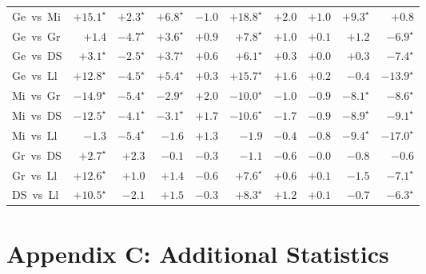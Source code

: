 \documentclass[11pt]{article}
\begin{document}
\begin{table}[H]
{\begin{tabular}{lrrrrrrrrr}
Ge~vs~Mi & $+15.1^\star$ & $+2.3^\star$ & $+6.8^\star$ & $-1.0$ & $+18.8^\star$ & $+2.0$ & $+1.0$ & $+9.3^\star$ & $+0.8$ \\
Ge~vs~Gr & $+1.4$ & $-4.7^\star$ & $+3.6^\star$ & $+0.9$ & $+7.8^\star$ & $+1.0$ & $+0.1$ & $+1.2$ & $-6.9^\star$ \\
Ge~vs~DS & $+3.1^\star$ & $-2.5^\star$ & $+3.7^\star$ & $+0.6$ & $+6.1^\star$ & $+0.3$ & $+0.0$ & $+0.3$ & $-7.4^\star$ \\
Ge~vs~Ll & $+12.8^\star$ & $-4.5^\star$ & $+5.4^\star$ & $+0.3$ & $+15.7^\star$ & $+1.6$ & $+0.2$ & $-0.4$ & $-13.9^\star$ \\
Mi~vs~Gr & $-14.9^\star$ & $-5.4^\star$ & $-2.9^\star$ & $+2.0$ & $-10.0^\star$ & $-1.0$ & $-0.9$ & $-8.1^\star$ & $-8.6^\star$ \\
Mi~vs~DS & $-12.5^\star$ & $-4.1^\star$ & $-3.1^\star$ & $+1.7$ & $-10.6^\star$ & $-1.7$ & $-0.9$ & $-8.9^\star$ & $-9.1^\star$ \\
Mi~vs~Ll & $-1.3$ & $-5.4^\star$ & $-1.6$ & $+1.3$ & $-1.9$ & $-0.4$ & $-0.8$ & $-9.4^\star$ & $-17.0^\star$ \\
Gr~vs~DS & $+2.7^\star$ & $+2.3$ & $-0.1$ & $-0.3$ & $-1.1$ & $-0.6$ & $-0.0$ & $-0.8$ & $-0.6$ \\
Gr~vs~Ll & $+12.6^\star$ & $+1.0$ & $+1.4$ & $-0.6$ & $+7.6^\star$ & $+0.6$ & $+0.1$ & $-1.5$ & $-7.1^\star$ \\
DS~vs~Ll & $+10.5^\star$ & $-2.1$ & $+1.5$ & $-0.3$ & $+8.3^\star$ & $+1.2$ & $+0.1$ & $-0.7$ & $-6.3^\star$ \\
\bottomrule
\end{tabular}%
}
\end{table}


\section*{Appendix C: Additional Statistics}
\end{document}
